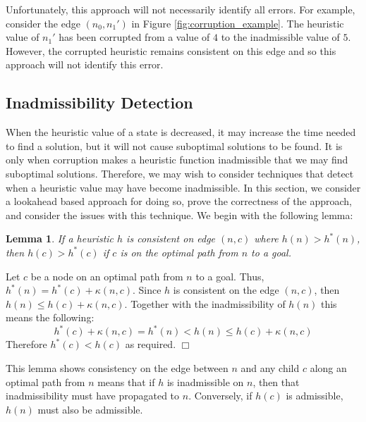 \documentclass[letterpaper]{article}
\newtheorem{lemma}{Lemma}
\newenvironment{proof}{\par\noindent{\em Proof.}}{\hfill $\Box$\medskip}
\begin{document}
Unfortunately, this approach will not necessarily identify all errors.
For example, consider the edge $(n_0, n_1')$ in Figure \ref{fig:corruption_example}.
The heuristic value of $n_1'$ has been corrupted from a value of $4$ to the inadmissible value of $5$.
However, the corrupted heuristic remains consistent on this edge and so this approach will not identify this error.












\subsection{Inadmissibility Detection}

When the heuristic value of a state is decreased, it may increase the time needed to find a solution, but it will not cause suboptimal solutions to be found. It is only when corruption makes a heuristic function inadmissible that we may find suboptimal solutions. Therefore, we may wish to consider techniques that detect when a heuristic value may have become inadmissible. In this section, we consider a lookahead based approach for doing so, prove the correctness of the approach, and consider the issues with this technique. We begin with the following lemma:


\begin{lemma}%
\label{lemma:inad_corruption}
If a heuristic $h$ is consistent on edge $(n, c)$ where $h(n)>h^*(n)$, then $h(c) > h^*(c)$ if $c$ is on the optimal path from $n$ to a goal.
\label{lem:inadmissible-corruption}
\end{lemma}
\begin{proof}
Let $c$ be a node on an optimal path from $n$ to a goal.
Thus, $h^*(n)=h^*(c)+\kappa (n,c)$. Since $h$ is consistent on the edge $(n, c)$, then $h(n)\leq h(c)+\kappa(n,c)$. Together with the inadmissibility of $h(n)$ this means the following:
\[ h^*(c)+\kappa(n,c)= h^*(n) < h(n) \leq h(c)+\kappa(n,c) \]
Therefore $h^*(c)<h(c)$ as required.
\end{proof}


This lemma shows consistency on the edge between $n$ and any child $c$ along an optimal path from $n$ means that if $h$ is inadmissible on $n$, then that inadmissibility must have propagated to $n$. Conversely, if $h(c)$ is admissible, $h(n)$ must also be admissible.
\end{document}
